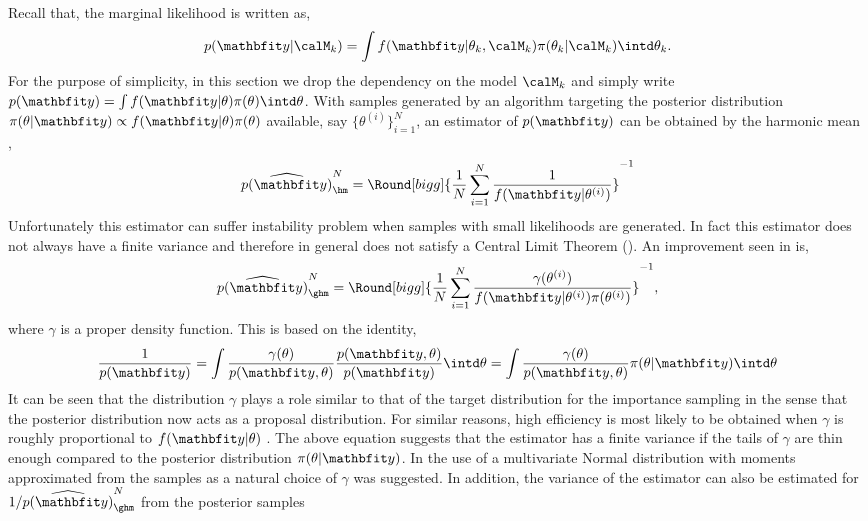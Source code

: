 Recall that, the marginal likelihood is written as,
\begin{equation*}
  p(\data|\calM_k) = \int
  f(\data|\theta_k,\calM_k)\pi(\theta_k|\calM_k)\intd\theta_k.
\end{equation*}
For the purpose of simplicity, in this section we drop the dependency on the
model $\calM_k$ and simply write $p(\data) = \int
f(\data|\theta)\pi(\theta)\intd\theta$. With samples generated by an \mcmc
algorithm targeting the posterior distribution $\pi(\theta|\data) \propto
f(\data|\theta) \pi(\theta)$ available, say $\{\theta^{(i)}\}_{i=1}^N$, an
estimator of $p(\data)$ can be obtained by the harmonic mean
\cite{Newton:1994wm},
\begin{equation}
  \widehat{p(\data)}_{\hm}^N =
  \Round[bigg]{\frac{1}{N}\sum_{i=1}^N\frac{1}{f(\data|\theta^{(i)})}}^{-1}
\end{equation}
Unfortunately this estimator can suffer instability problem when samples with
small likelihoods are generated. In fact this estimator does not always have a
finite variance and therefore in general does not satisfy a Central Limit
Theorem (\clt). An improvement seen in \cite{Kass:1995vb} is,
\begin{equation}
  \widehat{p(\data)}_{\ghm}^N = \Round[bigg]{
    \frac{1}{N}\sum_{i=1}^N
    \frac{\gamma(\theta^{(i)})}{f(\data|\theta^{(i)})\pi(\theta^{(i)})}}^{-1},
\end{equation}
where $\gamma$ is a proper density function. This is based on the identity,
\begin{equation}
  \frac{1}{p(\data)}
  = \int \frac{\gamma(\theta)}{p(\data,\theta)}
  \frac{p(\data,\theta)}{p(\data)} \intd \theta
  = \int \frac{\gamma(\theta)}{p(\data,\theta)} \pi(\theta|\data) \intd \theta
\end{equation}
It can be seen that the distribution $\gamma$ plays a role similar to that of
the target distribution for the importance sampling in the sense that the
posterior distribution now acts as a proposal distribution. For similar
reasons, high efficiency is most likely to be obtained when $\gamma$ is
roughly proportional to $f(\data|\theta)$ \cite{Kass:1995vb}. The above
equation suggests that the estimator has a finite variance if the tails of
$\gamma$ are thin enough compared to the posterior distribution
$\pi(\theta|\data)$. In \cite{Gelfand:1994ux} the use of a multivariate Normal
distribution with moments approximated from the samples as a natural choice of
$\gamma$ was suggested. In addition, the variance of the estimator can also be
estimated for $1/\widehat{p(\data)}_{\ghm}^N$ from the posterior samples
